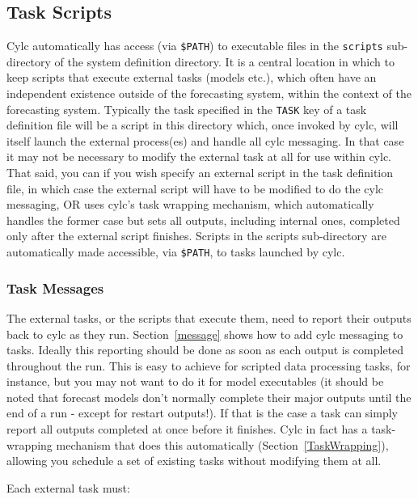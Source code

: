 \documentclass[11pt,a4paper]{article}
\begin{document}
\pagebreak
\subsection{Task Scripts}
\label{TaskScripts}

Cylc automatically has access (via \lstinline=$PATH=) to executable
files in the \lstinline=scripts= sub-directory of the system definition
directory. It is a central location in which to keep scripts that
execute external tasks (models etc.), which often have an independent
existence outside of the forecasting system, within the context of the
forecasting system.
Typically the task specified in the \lstinline=TASK=
key of a task definition file will be a script in this directory which,
once invoked by cylc, will itself launch the external process(es) and
handle all cylc messaging. In that case it may not be necessary to
modify the external task at all for use within cylc. That said, you can
if you wish specify an external script in the task definition file, in
which case the external script will have to be modified to do the cylc
messaging, OR uses cylc's task wrapping mechanism, which automatically
handles the former case but sets all outputs, including internal ones,
completed only after the external script finishes.  Scripts in the
scripts sub-directory are automatically made accessible, via 
\lstinline=$PATH=, to tasks launched by cylc. 

\subsubsection{Task Messages}

The external tasks, or the scripts that execute them, need to report
their outputs back to cylc as they run. Section~\ref{message} shows
how to add cylc messaging to tasks.  Ideally this reporting should be
done as soon as each output is completed throughout the run. This is
easy to achieve for scripted data processing tasks, for instance, but
you may not want to do it for model executables (it should be noted that
forecast models don't normally complete their major outputs until the
end of a run - except for restart outputs!). If that is the case a task
can simply report all outputs completed at once before it finishes.
Cylc in fact has a task-wrapping mechanism that does this automatically
(Section~\ref{TaskWrapping}), allowing you schedule a set of existing
tasks without modifying them at all.  

Each external task must:
\end{document}
